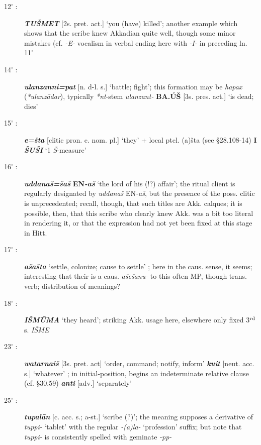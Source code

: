 \documentclass[10pt]{article}
\newcommand{\supersc}[1]{$^{\textrm{\scriptsize{#1}}}$}  	%
\newcommand{\bit}[1]{\textbf{\textit{#1}}}				%
\newcommand{\p}[1]{{\tiny[{#1}]}}					%
\newcommand{\pr}{\'{ }}									%
\newcommand{\hith}{\textsubwedge{h}}
\renewcommand{\.}[1]{\textsubdot{#1}}
\begin{document}
\begin{description}
\item[12{\pr} :] \bit{TU\v{S}MET} \p{2s. pret. act.} `you (have) killed'; another example which shows that the scribe knew Akkadian quite well, though some minor mistakes (cf. \textit{-E-} vocalism in verbal ending here with \textit{-I-} in preceding ln. 11{\pr}

\item[14{\pr} :] \bit{{\hith}ulanzanni=pat} \p{n. d-l. s.} `battle; fight'; this formation may be \textit{hapax} (\textit{*{\hith}ulanz\=adar}), typically \textit{*nt}-stem \textit{{\hith}ulanzant-} \textbf{BA.\'U\v{S}} \p{3s. pres. act.} `is dead; dies'

\item[15{\pr} :] \bit{e=\v{s}ta} \p{clitic pron. c. nom. pl.} `they' + local ptcl. {(a)\v{s}ta} (see  \S28.108-14) \textbf{I} \bit{\v{S}U\v{S}I} `1 \textit{\v{S}}-measure'

\item[16{\pr} :] \bit{uddana\v{s}=\v{s}a\v{s}} \textbf{EN}\bit{-a\v{s}} `the lord of his (!?) affair'; the ritual client is regularly designated by \textit{uddana\v{s}} EN\textit{-a\v{s}}, but the presence of the poss. clitic is unprecedented; recall, though, that such titles are Akk. calques; it is possible, then, that this scribe who clearly knew Akk. was a bit too literal in rendering it, or that the expression had not yet been fixed at this stage in Hitt.

\item[17{\pr} :] \bit{a\v{s}a\v{s}ta} `settle, colonize; cause to settle' ; here in the caus. sense, it seems; interesting that their is a caus. \textit{a\v{s}e\v{s}anu-} to this often MP, though trans. verb; distribution of meanings?

\item[18{\pr} :] \bit{I\v{S}M\=UMA} `they heard'; striking Akk. usage here, elsewhere only fixed 3\supersc{rd} s. \textit{I\v{S}ME}

\item[23{\pr} :] \bit{watarna{\hith\hith}i\v{s}} \p{3s. pret. act} `order, command; notify, inform' \bit{kuit} \p{neut. acc. s.} `whatever' ; in initial-position, begins an indeterminate relative clause (cf.  \S30.59) \bit{{\hith}anti} \p{adv.} `separately'

\item[25{\pr} :] \bit{tupal\=an} \p{c. acc. s.; a-st.} `scribe (?)'; the meaning supposes a derivative of \textit{tuppi-} `tablet' with the regular \textit{-(a)la-} `profession' suffix; but note that \textit{tuppi-} is consistently spelled with geminate \textit{-pp-}


\end{description}
\end{document}
